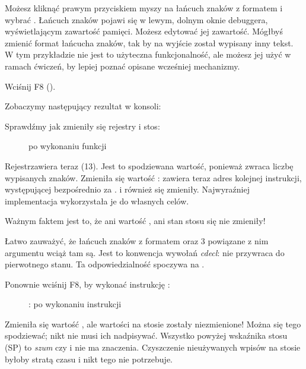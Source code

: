 Możesz kliknąć prawym przyciskiem myszy na łańcuch znaków z formatem i wybrać .
Łańcuch znaków pojawi się w lewym, dolnym oknie debuggera, wyświetlającym zawartość pamięci.
Możesz edytować jej zawartość.
Mógłbyś zmienić format łańcucha znaków, tak by na wyjście został wypisany inny tekst.
W tym przykładzie nie jest to użyteczna funkcjonalność, ale możesz jej użyć w ramach ćwiczeń, by lepiej poznać opisane wcześniej mechanizmy.

\clearpage
Wciśnij F8 (\stepover).

Zobaczymy następujący rezultat w konsoli:



Sprawdźmy jak zmieniły się rejestry i stos:

\begin{figure}[H]
\centering
{}
\caption{\olly po wykonaniu funkcji \printf{}}
\label{fig:printf3_olly_3}
\end{figure}

Rejestr\EAX zawiera teraz  (13).
Jest to spodziewana wartość, ponieważ \printf zwraca liczbę wypisanych znaków.
Zmieniła się wartość \EIP: zawiera teraz adres kolejnej instrukcji, występującej bezpośrednio za .
\ECX i \EDX również się zmieniły.
Najwyraźniej implementacja \printf wykorzystała je do własnych celów.

Ważnym faktem jest to, że ani wartość \ESP, ani stan stosu się nie zmieniły!

Łatwo zauważyć, że łańcuch znaków z formatem oraz 3 powiązane z nim argumentu wciąż tam są. Jest to konwencja wywołań \emph{cdecl}:  nie przywraca \ESP do pierwotnego stanu.
Ta odpowiedzialność spoczywa na .

\clearpage
Ponownie wciśnij F8, by wykonać instrukcję :

\begin{figure}[H]
\centering
{}
\caption{\olly: po wykonaniu instrukcji }
\label{fig:printf3_olly_4}
\end{figure}

Zmieniła się wartość \ESP, ale wartości na stosie zostały niezmienione!
Można się tego spodziewać; nikt nie musi ich nadpisywać.
Wszystko powyżej wskaźnika stosu (\ac{SP}) to \emph{szum} czy \emph{\garbage{}} i nie ma znaczenia.
Czyszczenie nieużywanych wpisów na stosie byłoby stratą czasu i nikt tego nie potrzebuje.

